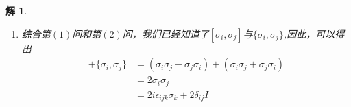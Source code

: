 \documentclass{article}
\newtheorem{solution}{解}
\newcommand{\pmtwo}[4]{
    \begin{pmatrix}
        #1&#2\\
        #3&#4
    \end{pmatrix}
    }
\begin{document}
\begin{solution}
\begin{enumerate}
        最后是$\{\sigma_1,\sigma_1\}$
        \begin{align*}
            \{\sigma_1,\sigma_1\}&=2\sigma_1\sigma_1\\
            &=2\pmtwo{0}{1}{1}{0}\pmtwo{0}{1}{1}{0}\\
            &=2\pmtwo{1}{0}{0}{1}\\
            &=2I
        \end{align*}
        
        综合以上所计算得到的，我们可以得出一个归纳性结论
        \begin{align*}
            \{\sigma_i,\sigma_j\}=2\delta_{ij}I
        \end{align*}
        \item[(3)] 综合第$(1)$问和第$(2)$问，我们已经知道了$[\sigma_i,\sigma_j]$与$\{\sigma_i,\sigma_j\}$,因此，可以得出
        \begin{align*}
            [\sigma_i,\sigma_j]+\{\sigma_i,\sigma_j\}&=(\sigma_i\sigma_j-\sigma_j\sigma_i)+(\sigma_i\sigma_j+\sigma_j\sigma_i)\\
            &=2\sigma_i\sigma_j\\
            &=2i\epsilon_{ijk}\sigma_k+2\delta_{ij}I
        \end{align*}


\end{enumerate}
\end{solution}
\end{document}
